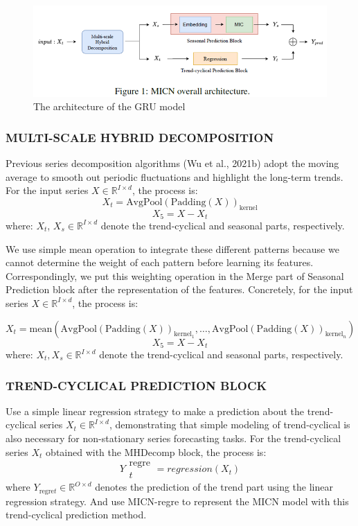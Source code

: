 \documentclass[conference]{IEEEtran}
\begin{document}
\begin{figure}[H]
    \centering
    \begin{minipage}{0.8\linewidth}
    \centering
        \includegraphics[width=\linewidth]{images/MICN.png}
    \caption{The architecture of the GRU model}
    \label{fig11}
    \end{minipage}
\end{figure}

\subsubsection{MULTI-SCALE HYBRID DECOMPOSITION}
Previous series decomposition algorithms (Wu et al., 2021b) adopt the moving average to smooth out periodic fluctuations and highlight the long-term trends. For the input series \(X \in \mathbb{R}^{I \times d}\), the process is:
\[X_t = \text{AvgPool}(\text{Padding}(X))_{\text{kernel}}\]
\[X_5 = X - X_t\]
where: \(X_t\), \(X_s \in \mathbb{R}^{I \times d}\) denote the trend-cyclical and seasonal parts, respectively.

We use simple mean operation to integrate these different patterns because we cannot determine the weight of each pattern before learning its features. Correspondingly, we put this weighting operation in the Merge part of Seasonal Prediction block after the representation of the features. Concretely, for the input series \(X \in \mathbb{R}^{I \times d}\), the process is:

\[X_t = \text{mean}(\text{AvgPool}(\text{Padding}(X))_{\text{kernel}_1}, \ldots, \text{AvgPool}(\text{Padding}(X))_{\text{kernel}_n})\]
\[X_5 = X - X_t\]
where: \(X_t, X_s \in \mathbb{R}^{I \times d}\) denote the trend-cyclical and seasonal parts, respectively.

\subsubsection{TREND-CYCLICAL PREDICTION BLOCK}
Use a simple linear regression strategy to make a prediction about the trend-cyclical series \(X_t \in \mathbb{R}^{I \times d}\), demonstrating that simple modeling of trend-cyclical is also necessary for non-stationary series forecasting tasks. For the trend-cyclical series \(X_t\) obtained with the MHDecomp block, the process is:
\[Y{\substack{\text{regre}\\t}}{} = regression(X_t)\]
where \(Y_{\text{regre}t} \in \mathbb{R}^{O \times d}\) denotes the prediction of the trend part using the linear regression strategy. And use MICN-regre to represent the MICN model with this trend-cyclical prediction method.
\end{document}
